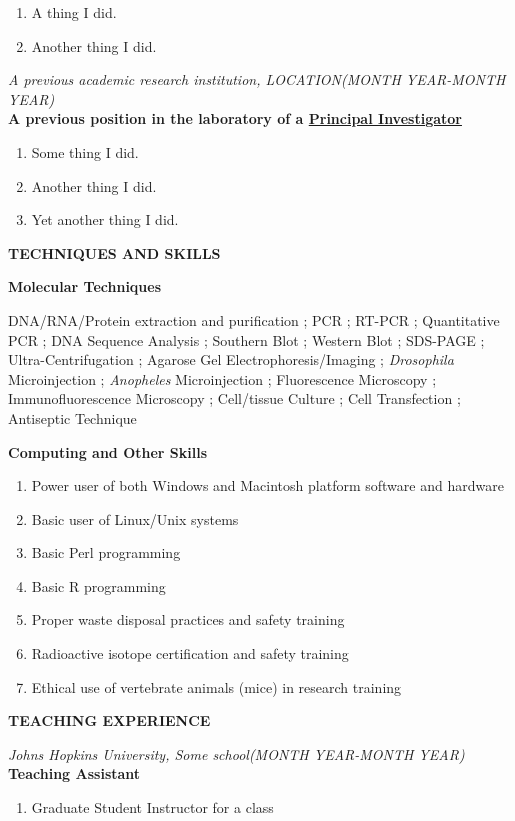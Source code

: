 \begin{enumerate}
\item A thing I did.
\item Another thing I did.
\end{enumerate}

\textit{A previous academic research institution, LOCATION\hfill(MONTH YEAR-MONTH YEAR)}\\
\textbf{\rmfamily A previous position in the laboratory of a \ul{Principal Investigator}}

\begin{enumerate}
\item Some thing I did.
\item Another thing I did.
\item Yet another thing I did.
\end{enumerate}

\textbf{TECHNIQUES AND SKILLS}

\textbf{\rmfamily Molecular Techniques}

\textrm{\noindent DNA/RNA/Protein extraction and purification ; PCR ; RT-PCR ; Quantitative 
PCR ; DNA Sequence Analysis ; Southern Blot ; Western Blot ; SDS-PAGE ; Ultra-Centrifugation 
; Agarose Gel Electrophoresis/Imaging ; \textit{Drosophila} Microinjection ;\textit{ 
Anopheles} Microinjection ; Fluorescence Microscopy ; Immunofluorescence Microscopy ; 
Cell/tissue Culture ; Cell Transfection ; Antiseptic Technique}

\textbf{\rmfamily Computing and Other Skills}
\begin{enumerate}
\item Power user of both Windows and Macintosh platform software and hardware
\item Basic user of Linux/Unix systems
\item Basic Perl programming
\item Basic R programming
\item Proper waste disposal practices and safety training
\item Radioactive isotope certification and safety training
\item Ethical use of vertebrate animals (mice) in research training
\end{enumerate}

\textbf{TEACHING EXPERIENCE}

\textit{Johns Hopkins University, Some school\hfill(MONTH YEAR-MONTH YEAR)}\\
\textbf{\rmfamily Teaching Assistant}
\begin{enumerate}
\item Graduate Student Instructor for a class
\end{enumerate}

